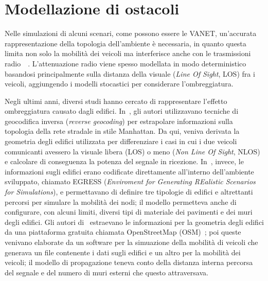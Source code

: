 \section{Modellazione di ostacoli}\label{sec:modellazione-ostacoli}
Nelle simulazioni di alcuni scenari, come possono essere le VANET, un'accurata rappresentazione della topologia dell'ambiente è necessaria,
in quanto questa limita non solo la mobilità dei veicoli ma interferisce anche con le trasmissioni radio~\cite{7543980}~\cite{amjad2015impact}.
L'attenuazione radio viene spesso modellata in modo deterministico basandosi principalmente sulla distanza della visuale (\textit{Line Of Sight}, LOS)
fra i veicoli, aggiungendo i modelli stocastici per considerare l'ombreggiatura.

Negli ultimi anni, diversi studi hanno cercato di rappresentare l'effetto ombreggiatura causato dagli edifici.
In~\cite{Giordano:2010:CST:1860058.1860065}, gli autori utilizzavano tecniche di geocodifica inversa (\textit{reverse geocoding}) per estrapolare
informazioni sulla topologia della rete stradale in stile Manhattan. Da qui, veniva derivata la geometria degli edifici utilizzata
per differenziare i casi in cui i due veicoli comunicanti avessero la visuale libera (LOS) o meno (\textit{Non Line Of Sight}, NLOS)
e calcolare di conseguenza la potenza del segnale in ricezione.
In~\cite{4020783}, invece, le informazioni sugli edifici erano codificate direttamente all'interno dell'ambiente sviluppato, chiamato
EGRESS (\textit{Enviroment for Generating REalistic Scenarios for Simulations}), e permettavano di definire tre tipologie di edifici e altrettanti
percorsi per simulare la mobilità dei nodi; il modello permetteva anche di configurare, con alcuni limiti, diversi tipi di materiale dei pavimenti e dei muri degli edifici.
Gli autori di~\cite{Carpenter:2015:OMI:2756509.2756512} estraevano le informazioni per la geometria degli edifici da una piattaforma gratuita
chiamata OpenStreetMap (OSM)~\cite{osmWebsite}; poi queste venivano elaborate da un software per la simuazione della mobilità di veicoli
che generava un file contenente i dati sugli edifici e un altro per la mobilità dei veicoli;
il modello di propagazione teneva conto della distanza interna percorsa del segnale e del numero di muri esterni che questo attraversava.
%
